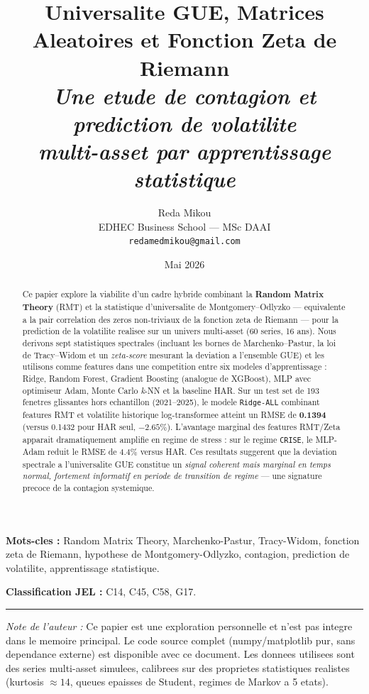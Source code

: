 \documentclass[11pt,a4paper]{article}
\title{\bfseries\color{paperblue}
  Universalite GUE, Matrices Aleatoires et Fonction Zeta de Riemann \\[0.2cm]
  \large\itshape Une etude de contagion et prediction de volatilite \\
  multi-asset par apprentissage statistique}
\author{
  Reda Mikou \\
  \small EDHEC Business School --- MSc DAAI \\
  \small \texttt{redamedmikou@gmail.com}
}
\date{Mai 2026}
\begin{document}
\maketitle

\begin{abstract}\noindent
Ce papier explore la viabilite d'un cadre hybride combinant la \textbf{Random Matrix Theory} (RMT) et la statistique d'universalite de Montgomery--Odlyzko --- equivalente a la pair correlation des zeros non-triviaux de la fonction zeta de Riemann --- pour la prediction de la volatilite realisee sur un univers multi-asset (60 series, 16 ans). Nous derivons sept statistiques spectrales (incluant les bornes de Marchenko--Pastur, la loi de Tracy--Widom et un \emph{zeta-score} mesurant la deviation a l'ensemble GUE) et les utilisons comme features dans une competition entre six modeles d'apprentissage : Ridge, Random Forest, Gradient Boosting (analogue de XGBoost), MLP avec optimiseur Adam, Monte Carlo \emph{k}-NN et la baseline HAR. Sur un test set de 193 fenetres glissantes hors echantillon (2021--2025), le modele \texttt{Ridge-ALL} combinant features RMT et volatilite historique log-transformee atteint un RMSE de \textbf{0.1394} (versus 0.1432 pour HAR seul, \textbf{$-2.65\%$}). L'avantage marginal des features RMT/Zeta apparait dramatiquement amplifie en regime de stress : sur le regime \texttt{CRISE}, le MLP-Adam reduit le RMSE de \textbf{$4.4\%$} versus HAR. Ces resultats suggerent que la deviation spectrale a l'universalite GUE constitue un \emph{signal coherent mais marginal en temps normal, fortement informatif en periode de transition de regime} --- une signature precoce de la contagion systemique.
\end{abstract}

\noindent\textbf{Mots-cles :} Random Matrix Theory, Marchenko-Pastur, Tracy-Widom, fonction zeta de Riemann, hypothese de Montgomery-Odlyzko, contagion, prediction de volatilite, apprentissage statistique.

\bigskip\noindent\textbf{Classification JEL :} C14, C45, C58, G17.

\vfill
\noindent\rule{\linewidth}{0.4pt}
\noindent\footnotesize
\textit{Note de l'auteur :} Ce papier est une exploration personnelle et n'est pas integre dans le memoire principal. Le code source complet (numpy/matplotlib pur, sans dependance externe) est disponible avec ce document. Les donnees utilisees sont des series multi-asset simulees, calibrees sur des proprietes statistiques realistes (kurtosis $\approx 14$, queues epaisses de Student, regimes de Markov a 5 etats).
\end{document}
